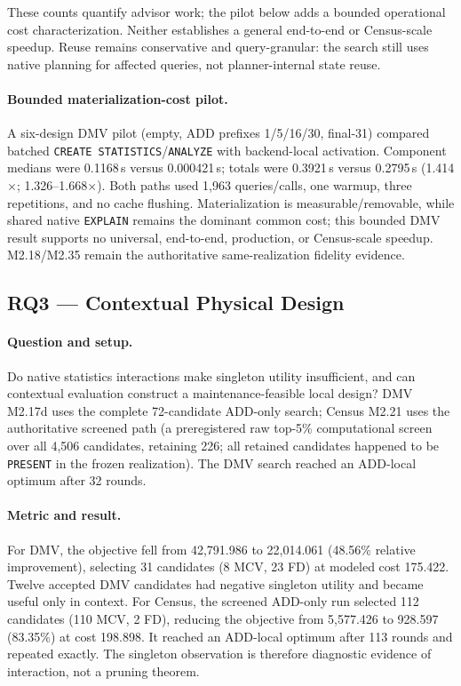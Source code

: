 These counts quantify advisor work; the pilot below adds a bounded operational
cost characterization.  Neither establishes a general end-to-end or
Census-scale speedup.  Reuse remains conservative and query-granular: the
search still uses native planning for affected queries, not planner-internal
state reuse.

\paragraph{Bounded materialization-cost pilot.}
A six-design DMV pilot (empty, ADD prefixes 1/5/16/30, final-31) compared
batched \texttt{CREATE STATISTICS}/\texttt{ANALYZE} with backend-local
activation.  Component medians were 0.1168\,s versus 0.000421\,s; totals
were 0.3921\,s versus 0.2795\,s (1.414$\times$; 1.326--1.668$\times$).
Both paths used 1,963 queries/calls, one warmup, three repetitions, and no
cache flushing.  Materialization is measurable/removable, while shared native
\texttt{EXPLAIN} remains the dominant common cost; this bounded DMV result
supports no universal, end-to-end, production, or Census-scale speedup.
M2.18/M2.35 remain the authoritative same-realization fidelity evidence.

\subsection{RQ3 --- Contextual Physical Design}

\paragraph{Question and setup.}
Do native statistics interactions make singleton utility insufficient, and can
contextual evaluation construct a maintenance-feasible local design?  DMV
M2.17d uses the complete 72-candidate ADD-only search; Census M2.21 uses the
authoritative screened path (a preregistered raw top-5\% computational screen
over all 4,506 candidates, retaining 226; all retained candidates happened to
be \texttt{PRESENT} in the frozen realization).  The DMV search reached an
ADD-local optimum after 32 rounds.

\paragraph{Metric and result.}
For DMV, the objective fell from 42,791.986 to 22,014.061 (48.56\% relative
improvement), selecting 31 candidates (8 MCV, 23 FD) at modeled cost
175.422.  Twelve accepted DMV candidates had negative singleton utility and
became useful only in context.  For Census, the screened ADD-only run selected
112 candidates (110 MCV, 2 FD), reducing the objective from 5,577.426 to
928.597 (83.35\%) at cost 198.898.  It reached an ADD-local optimum after
113 rounds and repeated exactly.  The singleton observation is therefore
diagnostic evidence of interaction, not a pruning theorem.

